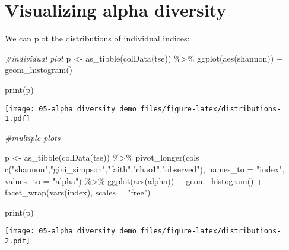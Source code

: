 \documentclass[
  oneside]{book}
\newenvironment{Shaded}{\begin{snugshade}}{\end{snugshade}}
\newcommand{\AttributeTok}[1]{\textcolor[rgb]{0.77,0.63,0.00}{#1}}
\newcommand{\CommentTok}[1]{\textcolor[rgb]{0.56,0.35,0.01}{\textit{#1}}}
\newcommand{\FunctionTok}[1]{\textcolor[rgb]{0.00,0.00,0.00}{#1}}
\newcommand{\NormalTok}[1]{#1}
\newcommand{\OtherTok}[1]{\textcolor[rgb]{0.56,0.35,0.01}{#1}}
\newcommand{\SpecialCharTok}[1]{\textcolor[rgb]{0.00,0.00,0.00}{#1}}
\newcommand{\StringTok}[1]{\textcolor[rgb]{0.31,0.60,0.02}{#1}}
\begin{document}
\hypertarget{visualizing-alpha-diversity}{%
\section{Visualizing alpha diversity}\label{visualizing-alpha-diversity}}

We can plot the distributions of individual indices:

\begin{Shaded}
\begin{Highlighting}[]
\CommentTok{\#individual plot}
\NormalTok{p }\OtherTok{\textless{}{-}} \FunctionTok{as\_tibble}\NormalTok{(}\FunctionTok{colData}\NormalTok{(tse)) }\SpecialCharTok{\%\textgreater{}\%} 
  \FunctionTok{ggplot}\NormalTok{(}\FunctionTok{aes}\NormalTok{(shannon)) }\SpecialCharTok{+}
  \FunctionTok{geom\_histogram}\NormalTok{() }

\FunctionTok{print}\NormalTok{(p)}
\end{Highlighting}
\end{Shaded}

\texttt{[image: 05-alpha\_diversity\_demo\_files/figure-latex/distributions-1.pdf]}

\begin{Shaded}
\begin{Highlighting}[]
\CommentTok{\#multiple plots}

\NormalTok{p }\OtherTok{\textless{}{-}} \FunctionTok{as\_tibble}\NormalTok{(}\FunctionTok{colData}\NormalTok{(tse)) }\SpecialCharTok{\%\textgreater{}\%} 
  \FunctionTok{pivot\_longer}\NormalTok{(}\AttributeTok{cols =} \FunctionTok{c}\NormalTok{(}\StringTok{"shannon"}\NormalTok{,}\StringTok{"gini\_simpson"}\NormalTok{,}\StringTok{"faith"}\NormalTok{,}\StringTok{"chao1"}\NormalTok{,}\StringTok{"observed"}\NormalTok{), }\AttributeTok{names\_to =} \StringTok{"index"}\NormalTok{, }\AttributeTok{values\_to =} \StringTok{"alpha"}\NormalTok{) }\SpecialCharTok{\%\textgreater{}\%} 
  \FunctionTok{ggplot}\NormalTok{(}\FunctionTok{aes}\NormalTok{(alpha)) }\SpecialCharTok{+}
  \FunctionTok{geom\_histogram}\NormalTok{() }\SpecialCharTok{+}
  \FunctionTok{facet\_wrap}\NormalTok{(}\FunctionTok{vars}\NormalTok{(index), }\AttributeTok{scales =} \StringTok{"free"}\NormalTok{)}


\FunctionTok{print}\NormalTok{(p)}
\end{Highlighting}
\end{Shaded}

\texttt{[image: 05-alpha\_diversity\_demo\_files/figure-latex/distributions-2.pdf]}
\end{document}
